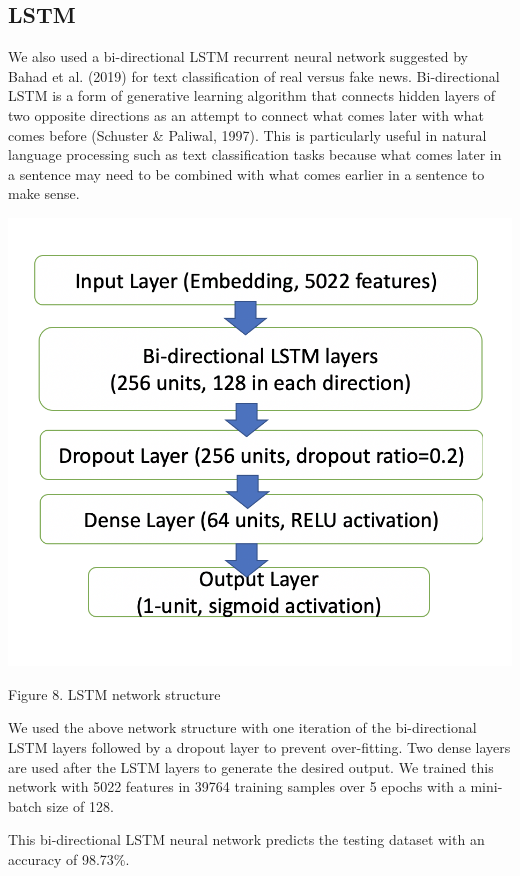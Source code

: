 \documentclass{article}
\begin{document}
\begin{multicols}{2}
\subsection{LSTM}
We also used a bi-directional LSTM recurrent neural network suggested by Bahad et al. (2019) for text classification of real versus fake news. Bi-directional LSTM is a form of generative learning algorithm that connects hidden layers of two opposite directions as an attempt to connect what comes later with what comes before (Schuster \& Paliwal, 1997). This is particularly useful in natural language processing such as text classification tasks because what comes later in a sentence may need to be combined with what comes earlier in a sentence to make sense.

\begin{center}
\includegraphics[scale=0.35]{images/img5.png}
\newline
\caption{Figure 8. LSTM network structure}
\end{center}

We used the above network structure with one iteration of the bi-directional LSTM layers followed by a dropout layer to prevent over-fitting. Two dense layers are used after the LSTM layers to generate the desired output. We trained this network with 5022 features in 39764 training samples over 5 epochs with a mini-batch size of 128.


This bi-directional LSTM neural network predicts the testing dataset with an accuracy of 98.73\%.


\end{multicols}
\end{document}
